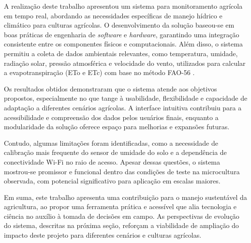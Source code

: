 A realização deste trabalho apresentou um sistema  para monitoramento agrícola em tempo real, abordando as necessidades específicas de manejo hídrico e climático para culturas agrícolas. O desenvolvimento da solução baseou-se em boas práticas de engenharia de \textit{software} e \textit{hardware}, garantindo uma integração consistente entre os componentes físicos e computacionais. Além disso, o sistema permitiu a coleta de dados ambientais relevantes, como temperatura, umidade, radiação solar, pressão atmosférica e velocidade do vento, utilizados para calcular a evapotranspiração (ETo e ETc) com base no método FAO-56 \parencite{Allen_evapotranspiration1998}.

Os resultados obtidos demonstraram que o sistema atende aos objetivos propostos, especialmente no que tange à usabilidade, flexibilidade e capacidade de adaptação a diferentes cenários agrícolas. A interface intuitiva contribuiu para a acessibilidade e compreensão dos dados pelos usuários finais, enquanto a modularidade da solução oferece espaço para melhorias e expansões futuras.

Contudo, algumas limitações foram identificadas, como a necessidade de calibração mais frequente do sensor de umidade do solo e a dependência de conectividade Wi-Fi no raio de acesso. Apesar dessas questões, o sistema mostrou-se promissor e funcional dentro das condições de teste na microcultura observada, com potencial significativo para aplicação em escalas maiores.

Em suma, este trabalho apresenta uma contribuição para o manejo sustentável da agricultura, ao propor uma ferramenta prática e acessível que alia tecnologia e ciência no auxílio à tomada de decisões em campo. As perspectivas de evolução do sistema, descritas na próxima seção, reforçam a viabilidade de ampliação do impacto deste projeto para diferentes cenários e culturas agrícolas.